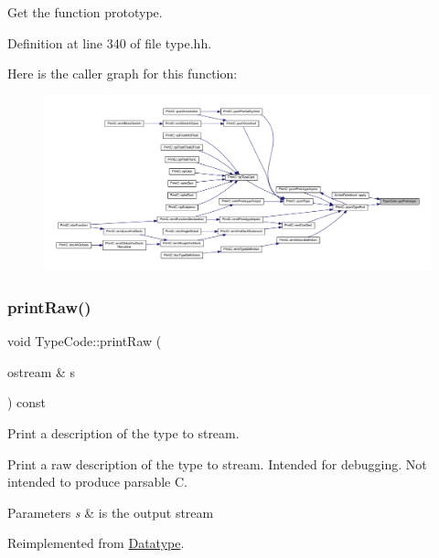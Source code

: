 Get the function prototype. 



Definition at line 340 of file type.\+hh.

Here is the caller graph for this function\+:
\nopagebreak
\begin{figure}[H]
\begin{center}
\leavevmode
\includegraphics[width=350pt]{class_type_code_a2c6a4552d7ac88c7597f22479f5e11b0_icgraph}
\end{center}
\end{figure}
\mbox{\label{class_type_code_a1e8d400271941042d3dcb8402876ce02}} 
\subsubsection{\texorpdfstring{printRaw()}{printRaw()}}
{\footnotesize\ttfamily void Type\+Code\+::print\+Raw (\begin{DoxyParamCaption}\item[{ostream \&}]{s }\end{DoxyParamCaption}) const\hspace{0.3cm}{\ttfamily [virtual]}}



Print a description of the type to stream. 

Print a raw description of the type to stream. Intended for debugging. Not intended to produce parsable C. 
\begin{DoxyParams}{Parameters}
{\em s} & is the output stream \\
\hline
\end{DoxyParams}


Reimplemented from \mbox{\hyperlink{class_datatype_a034a9b665df1a06f17fd3dfe61e7bf41}{Datatype}}.



